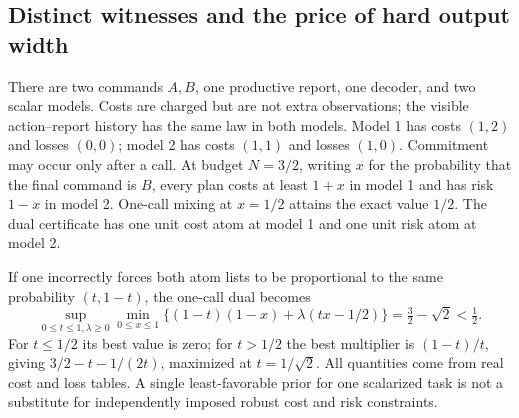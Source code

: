 \subsection{Distinct witnesses and the price of hard output width}
\begin{example}\label{ex:distinct-dual-witnesses}
There are two commands $A,B$, one productive report, one decoder, and two scalar models. Costs are charged but are not extra observations; the visible action--report history has the same law in both models. Model 1 has costs $(1,2)$ and losses $(0,0)$; model 2 has costs $(1,1)$ and losses $(1,0)$. Commitment may occur only after a call. At budget $N=3/2$, writing $x$ for the probability that the final command is $B$, every plan costs at least $1+x$ in model 1 and has risk $1-x$ in model 2. One-call mixing at $x=1/2$ attains the exact value $1/2$. The dual certificate has one unit cost atom at model 1 and one unit risk atom at model 2.

If one incorrectly forces both atom lists to be proportional to the same probability $(t,1-t)$, the one-call dual becomes
\[
 \sup_{0\le t\le1,\lambda\ge0}\min_{0\le x\le1}
 \{(1-t)(1-x)+\lambda(tx-1/2)\}
       =\tfrac32-\sqrt2<\tfrac12.
\]
For $t\le1/2$ its best value is zero; for $t>1/2$ the best multiplier is $(1-t)/t$, giving $3/2-t-1/(2t)$, maximized at $t=1/\sqrt2$. All quantities come from real cost and loss tables. A single least-favorable prior for one scalarized task is not a substitute for independently imposed robust cost and risk constraints.
\end{example}

